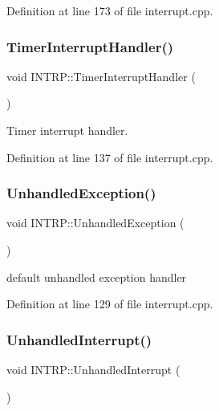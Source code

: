 Definition at line 173 of file interrupt.\+cpp.

\mbox{\label{namespace_i_n_t_r_p_a0232249076503af19eee46e59a4e5bb8}} 
\subsubsection{\texorpdfstring{Timer\+Interrupt\+Handler()}{TimerInterruptHandler()}}
{\footnotesize\ttfamily void I\+N\+T\+R\+P\+::\+Timer\+Interrupt\+Handler (\begin{DoxyParamCaption}{ }\end{DoxyParamCaption})}



Timer interrupt handler. 



Definition at line 137 of file interrupt.\+cpp.

\mbox{\label{namespace_i_n_t_r_p_a7732859732913734b09dd07030c41991}} 
\subsubsection{\texorpdfstring{Unhandled\+Exception()}{UnhandledException()}}
{\footnotesize\ttfamily void I\+N\+T\+R\+P\+::\+Unhandled\+Exception (\begin{DoxyParamCaption}{ }\end{DoxyParamCaption})}



default unhandled exception handler 



Definition at line 129 of file interrupt.\+cpp.

\mbox{\label{namespace_i_n_t_r_p_a13c03019c9d7b305743516310096a82a}} 
\subsubsection{\texorpdfstring{Unhandled\+Interrupt()}{UnhandledInterrupt()}}
{\footnotesize\ttfamily void I\+N\+T\+R\+P\+::\+Unhandled\+Interrupt (\begin{DoxyParamCaption}{ }\end{DoxyParamCaption})}



